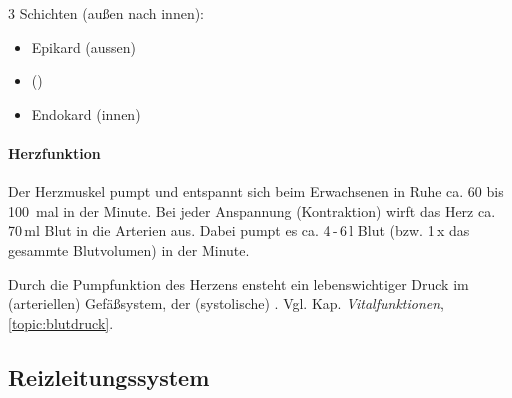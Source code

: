 3 Schichten (außen nach innen):
\begin{itemize}
\item Epikard (aussen)
\item {} ()
\item Endokard (innen)
\end{itemize}



 


\paragraph{Herzfunktion}\label{topic:herzfunktion}

Der Herzmuskel pumpt und entspannt sich beim Erwachsenen
in Ruhe ca. 60 bis 100~mal in der Minute. Bei jeder
Anspannung (Kontraktion) wirft das Herz ca. 70\,ml Blut in die Arterien
aus. Dabei pumpt es ca. 4\,-\,6\,l  Blut (bzw. 1\,x das
gesammte Blutvolumen) in der Minute.

Durch die Pumpfunktion des Herzens ensteht ein
lebenswichtiger Druck im (arteriellen) Gefäßsystem, der
(systolische) . Vgl. Kap.
\emph{Vitalfunktionen}, \ref{topic:blutdruck}. 

%
%
\subsection{Reizleitungssystem}


